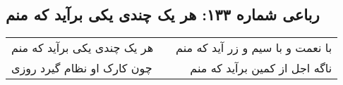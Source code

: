 \begin{center}
\section*{رباعی شماره ۱۳۳: هر یک چندی یکی برآید که منم}
\label{sec:sh133}
\begin{longtable}{l p{0.5cm} r}
هر یک چندی یکی برآید که منم
&&
با نعمت و با سیم و زر آید که منم
\\
چون کارک او نظام گیرد روزی
&&
ناگه اجل از کمین برآید که منم
\\
\end{longtable}
\end{center}
